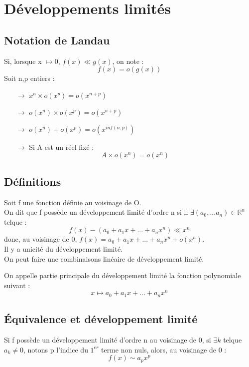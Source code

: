 \chapter{Développements limités}
\section{Notation de Landau}
\begin{de}
 Si, lorsque x $\mapsto 0$, $f(x)\ll g(x)$, on note : 
$$f(x)=o(g(x))$$
Soit n,p entiers :
\begin{itemize}
 \item[$\rightarrow$] $x^n \times o(x^p) = o(x^{n+p})$
 \item[$\rightarrow$] $o(x^n)\times o(x^p) = o(x^{n+p})$
 \item[$\rightarrow$] $o(x^n)+o(x^p) = o(x^{inf(n,p)})$
 \item[$\rightarrow$] Si A est un réel fixé :
$$A \times o(x^n) = o(x^n)$$
\end{itemize}
\end{de}
\section{Définitions}
\begin{de}
Soit f une fonction définie au voisinage de O. \\
On dit que f possède un développement limité d'ordre n si il $\exists(a_0,...a_n) \in \mathbb{R}^n$ telque :
$$f(x)-(a_0+a_1x+...+a_nx^n) \ll x^n$$
donc, au voisinage de 0, $f(x)=a_0+a_1x+...+a_nx^n+o(x^n)$. \\
Il y a unicité du développement limité.\\
On peut faire une combinaisons linéaire de développement limité.
\end{de}
\begin{de}
 On appelle partie principale du développement limité la fonction polynomiale suivant : 
$$x\mapsto a_0+a_1x+...+a_nx^n$$
\end{de}
\section{Équivalence et développement limité}
\begin{de}
Si f possède un développement limité d'ordre n au voisinage de 0, si $\exists k$ telque $a_k\neq 0$, notons p l'indice du $1^{er}$
terme non nuls, alors, au voisinage de 0 :
$$f(x)\sim a_px^p$$
\end{de}
